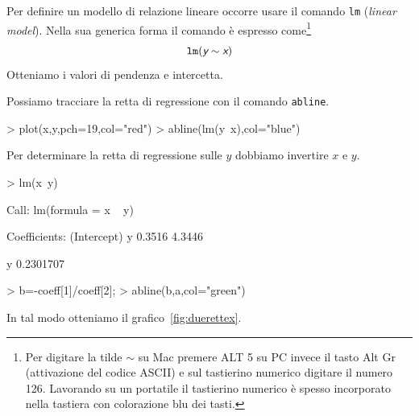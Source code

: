 \documentclass[onecolumn,12pt]{book}
\newcommand{\varia}[1]{\textsl{\textsf{#1}}}
\newcommand{\mytilde}{$\sim$}
\begin{document}
Per definire un modello di relazione lineare occorre usare il comando \texttt{lm} (\varia{linear model}).
Nella sua generica forma il comando \`e espresso come\footnote{ Per digitare la tilde  \mytilde\;  su Mac premere ALT 5 su PC invece il tasto Alt Gr (attivazione del codice ASCII) e sul tastierino numerico digitare il numero 126. Lavorando su un portatile il tastierino numerico \`e spesso incorporato nella tastiera con colorazione blu dei tasti.}
$$\texttt{lm}(\varia{y} \sim  \varia{x})$$
Otteniamo i valori di pendenza e intercetta.

Possiamo tracciare la retta di regressione con il comando \texttt{abline}.
\begin{Schunk}
\begin{Sinput}
> plot(x,y,pch=19,col="red")
> abline(lm(y~x),col="blue")
\end{Sinput}
\end{Schunk}
Per determinare  la retta di regressione sulle $y$ dobbiamo invertire $x$ e $y$.
\begin{Schunk}
\begin{Sinput}
> lm(x~y)
\end{Sinput}
\begin{Soutput}
Call:
lm(formula = x ~ y)

Coefficients:
(Intercept)            y  
     0.3516       4.3446  
\end{Soutput}
\begin{Soutput}
        y 
0.2301707 
\end{Soutput}
\begin{Sinput}
> b=-coeff[1]/coeff[2];
> abline(b,a,col="green")
\end{Sinput}
\end{Schunk}
In tal modo otteniamo il grafico~\ref{fig:duerettex}.
\end{document}
